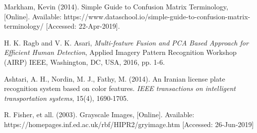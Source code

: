 \begin{thebibliography}{7}
{Markham, Kevin (2014). Simple Guide to Confusion Matrix Terminology, [Online]. Available: https://www.dataschool.io/simple-guide-to-confusion-matrix-terminology/ [Accessed: 22-Apr-2019].}

{H. K. Ragb and V. K. Asari, \emph{Multi-feature Fusion and PCA Based Approach for Efficient Human Detection}, Applied Imagery Pattern Recognition Workshop (AIRP) IEEE, Washington, DC, USA, 2016, pp. 1-6.}

{Ashtari, A. H., Nordin, M. J., Fathy, M. (2014). An Iranian license plate recognition system based on color features. \emph{IEEE transactions on intelligent transportation systems}, 15(4), 1690-1705.}

{R. Fisher, et all. (2003). Grayscale Images, [Online]. Available: https://homepages.inf.ed.ac.uk/rbf/HIPR2/gryimage.htm [Accessed: 26-Jun-2019]}


\end{thebibliography}